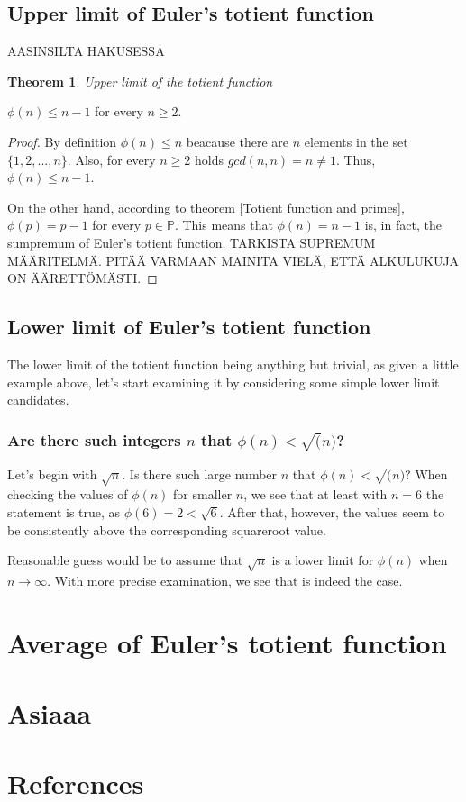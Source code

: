 \documentclass{article}
\theoremstyle{definition}
\newtheorem{theorem}[subsection]{Theorem}
\begin{document}
\subsection{Upper limit of Euler's totient function}

AASINSILTA HAKUSESSA

\begin{theorem}{\emph{Upper limit of the totient function}}

$\phi(n) \leq n-1$ for every $n \geq 2$.

\begin{proof}

By definition $\phi(n) \leq n$ beacause there are $n$ elements in the set $\{1,2,...,n\}$. Also, for every $n \geq 2$ holds $gcd(n,n) = n \neq 1$. Thus, $\phi(n) \leq n-1$.

On the other hand, according to theorem \ref{Totient function and primes}, $\phi(p) = p-1$ for every $p\in\mathbb{P}$. This means that $\phi(n) = n-1$ is, in fact, the sumpremum of Euler's totient function. TARKISTA SUPREMUM MÄÄRITELMÄ. PITÄÄ VARMAAN MAINITA VIELÄ, ETTÄ ALKULUKUJA ON ÄÄRETTÖMÄSTI.

\end{proof}

\end{theorem}

\subsection{Lower limit of Euler's totient function}

The lower limit of the totient function being anything but trivial, as given a little example above, let's start examining it by considering some simple lower limit candidates.

\subsubsection{Are there such integers $n$ that $\phi(n) < \sqrt(n)$?}

Let's begin with $\sqrt{n}$. Is there such large number $n$ that $\phi(n) < \sqrt(n)$? When checking the values of $\phi(n)$ for smaller $n$, we see that at least with $n=6$ the statement is true, as $\phi(6)=2<\sqrt{6}$. After that, however, the values seem to be consistently above the corresponding squareroot value.

Reasonable guess would be to assume that $\sqrt{n}$ is a lower limit for $\phi(n)$ when $n \rightarrow \infty$. With more precise examination, we see that is indeed the case.

\section{Average of Euler's totient function}

\section{Asiaaa}

\section{References}

\printbibliography[heading=none]
\end{document}
